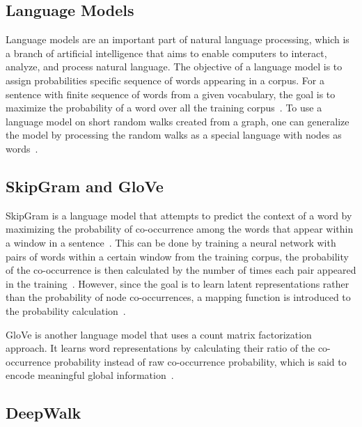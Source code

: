\subsection{Language Models}

Language models are an important part of natural language processing, which is a branch of artificial intelligence that aims to enable computers to interact, analyze, and process natural language.
The objective of a language model is to assign probabilities specific sequence of words appearing in a corpus.
For a sentence with finite sequence of words from a given vocabulary, the goal is to maximize the probability of a word over all the training corpus~\cite{perozzi_deepwalk:_2014}.
To use a language model on short random walks created from a graph, one can generalize the model by processing the random walks as a special language with nodes as words~\cite{perozzi_deepwalk:_2014}.

\subsection{SkipGram and GloVe}

SkipGram is a language model that attempts to predict the context of a word by maximizing the probability of co-occurrence among the words that appear within a window in a sentence~\cite{perozzi_deepwalk:_2014}.
This can be done by training a neural network with pairs of words within a certain window from the training corpus, the probability of the co-occurrence is then calculated by the number of times each pair appeared in the training~\cite{mccormick_word2vec_nodate}.
However, since the goal is to learn latent representations rather than the probability of node co-occurrences, a mapping function is introduced to the probability calculation~\cite{perozzi_deepwalk:_2014}.

\ac{GloVe} is another language model that uses a count matrix factorization approach.
It learns word representations by calculating their ratio of the co-occurrence probability instead of raw co-occurrence probability, which is said to encode meaningful global information~\cite{pennington_glove:_2014}.

\subsection{DeepWalk}

